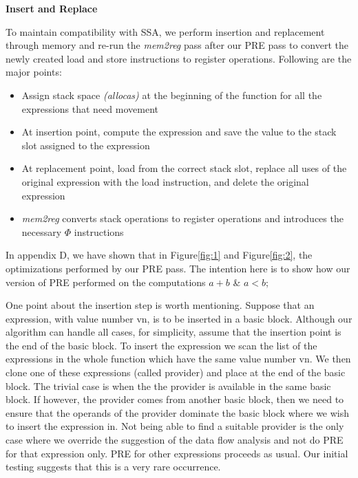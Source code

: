 \documentclass[10pt,twoside]{report}
\begin{document}
\begin{flushleft}
\textbf{\large{Insert and Replace}}
\end{flushleft}
To maintain compatibility with SSA, we perform insertion and replacement
  through memory and re-run the \emph{mem2reg} pass after our PRE pass to convert the
  newly created load and store instructions to register operations. Following
  are the major points:
\begin{itemize}  
  \item Assign stack space \emph{(allocas)} at the beginning of the
  function for all the expressions that need movement
  \item At insertion point,
           compute the expression and save the value to the stack slot assigned to the
             expression 
  \item At replacement point, load from the correct stack
             slot, replace all uses of the original expression with the load
             instruction, and delete the original expression
  \item \emph{mem2reg} converts stack operations to register operations and introduces the 
             necessary ${\Phi}$ instructions
\end{itemize}  

In appendix D, we have shown that in Figure\ref{fig:1}
and Figure\ref{fig:2}, the optimizations performed by our PRE pass. The intention here is to
  show how our version of PRE performed on the computations $a + b$ \& $a < b$;

One point about the insertion step is worth mentioning. Suppose that an
expression, with value number vn, is to be inserted in a basic block.
Although our algorithm can handle all cases, for simplicity, assume that the
insertion point is the end of the basic block. To insert the expression we
scan the list of the expressions in the whole function which have the same
value number vn.  We then clone one of these expressions (called provider)
  and place at the end of the basic block. The trivial case is when the the
  provider is available in the same basic block. If however, the provider
  comes from another basic block, then we need to ensure that the operands
  of the provider dominate the basic block where we wish to insert the
  expression in. Not being able to find a suitable provider is the only case
  where we override the suggestion of the data flow analysis and not do PRE
  for that expression only. PRE for other expressions proceeds as usual. Our
  initial testing suggests that this is a very rare occurrence. 
\end{document}
